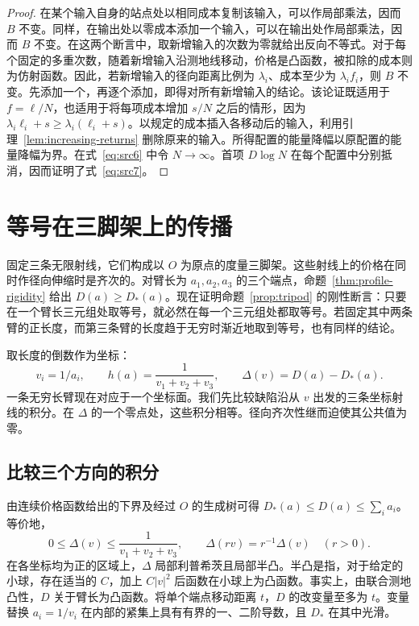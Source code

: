 \begin{proof}
在某个输入自身的站点处以相同成本复制该输入，可以作局部乘法，因而 $B$ 不变。同样，在输出处以零成本添加一个输入，可以在输出处作局部乘法，因而 $B$ 不变。在这两个断言中，取新增输入的次数为零就给出反向不等式。对于每个固定的多重次数，随着新增输入沿测地线移动，价格是凸函数，被扣除的成本则为仿射函数。因此，若新增输入的径向距离比例为 $\lambda_i$、成本至少为 $\lambda_i f_i$，则 $B$ 不变。先添加一个，再逐个添加，即得对所有新增输入的结论。该论证既适用于 $f=\ell/N$，也适用于将每项成本增加 $s/N$ 之后的情形，因为 $\lambda_i\ell_i+s\ge
\lambda_i(\ell_i+s)$。以规定的成本插入各移动后的输入，利用引理~\ref{lem:increasing-returns} 删除原来的输入。所得配置的能量降幅以原配置的能量降幅为界。在式~\eqref{eq:src6} 中令 $N\to\infty$。首项 $D\log N$ 在每个配置中分别抵消，因而证明了式~\eqref{eq:src7}。
\end{proof}

\section{等号在三脚架上的传播}\label{sec:contact}

固定三条无限射线，它们构成以 $O$ 为原点的度量三脚架。这些射线上的价格在同时作径向伸缩时是齐次的。对臂长为 $a_1,a_2,a_3$ 的三个端点，命题~\ref{thm:profile-rigidity} 给出 $D(a)\ge D_*(a)$。现在证明命题~\ref{prop:tripod} 的刚性断言：只要在一个臂长三元组处取等号，就必然在每一个三元组处都取等号。若固定其中两条臂的正长度，而第三条臂的长度趋于无穷时渐近地取到等号，也有同样的结论。

取长度的倒数作为坐标：
\[
 v_i=1/a_i,\qquad h(a)=\frac{1}{v_1+v_2+v_3},\qquad
 \Delta(v)=D(a)-D_*(a).
\]
一条无穷长臂现在对应于一个坐标面。我们先比较缺陷沿从 $v$ 出发的三条坐标射线的积分。在 $\Delta$ 的一个零点处，这些积分相等。径向齐次性继而迫使其公共值为零。

\subsection{比较三个方向的积分}

由连续价格函数给出的下界及经过 $O$ 的生成树可得 $D_*(a)\le D(a)\le\sum_i a_i$。等价地，
\begin{equation}\label{eq:defectbound}
 0\le \Delta(v)\le\frac{1}{v_1+v_2+v_3},\qquad
 \Delta(rv)=r^{-1}\Delta(v)\quad(r>0).
\end{equation}
在各坐标均为正的区域上，$\Delta$ 局部利普希茨且局部半凸。半凸是指，对于给定的小球，存在适当的 $C$，加上 $C|v|^2$ 后函数在小球上为凸函数。事实上，由联合测地凸性，$D$ 关于臂长为凸函数。将单个端点移动距离 $t$，$D$ 的改变量至多为 $t$。变量替换 $a_i=1/v_i$ 在内部的紧集上具有有界的一、二阶导数，且 $D_*$ 在其中光滑。

